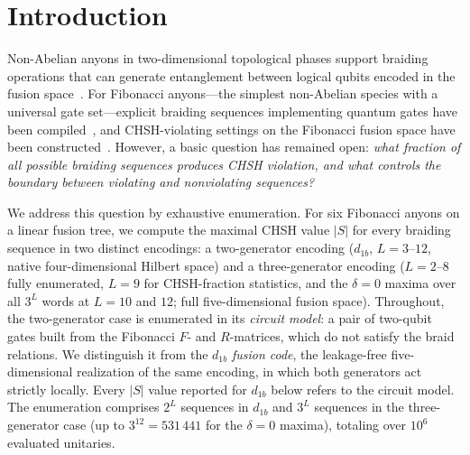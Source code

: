 \documentclass[aps,pra,twocolumn,superscriptaddress,longbibliography,floatfix,nofootinbib]{revtex4-2}
\begin{document}

\maketitle



\section{Introduction}
\label{sec:intro}

Non-Abelian anyons in two-dimensional topological phases support
braiding operations that can generate entanglement between logical
qubits encoded in the fusion space~\cite{Nayak2008,Freedman2003}.
For Fibonacci anyons---the simplest non-Abelian species with a
universal gate set---explicit braiding sequences implementing quantum
gates have been compiled~\cite{Bonesteel2005,Hormozi2007}, and
CHSH-violating settings on the Fibonacci fusion space have been
constructed~\cite{Brennen2009}.
However, a basic question has remained open:
\emph{what fraction of all possible braiding sequences produces
CHSH violation, and what controls the boundary between violating
and nonviolating sequences?}

We address this question by exhaustive enumeration.
For six Fibonacci anyons on a linear fusion tree, we compute the
maximal CHSH value $|S|$ for every braiding sequence in two
distinct encodings: a two-generator encoding
($d_{1b}$, $L=3$--$12$, native four-dimensional Hilbert space)
and a three-generator encoding ($L=2$--$8$ fully enumerated, $L=9$ for
CHSH-fraction statistics, and the $\delta = 0$ maxima over all $3^L$ words at
$L = 10$ and $12$; full five-dimensional fusion space).
Throughout, the two-generator case is enumerated in its
\emph{circuit model}: a pair of two-qubit gates built from the
Fibonacci $F$- and $R$-matrices, which do not satisfy the braid
relations. We distinguish it from the $d_{1b}$ \emph{fusion code},
the leakage-free five-dimensional realization of the same encoding,
in which both generators act strictly locally. Every $|S|$ value
reported for $d_{1b}$ below refers to the circuit model.
The enumeration comprises $2^L$ sequences in $d_{1b}$ and $3^L$
sequences in the three-generator case (up to $3^{12}=531\,441$ for the $\delta
= 0$ maxima),
totaling over $10^6$ evaluated unitaries.
\end{document}
